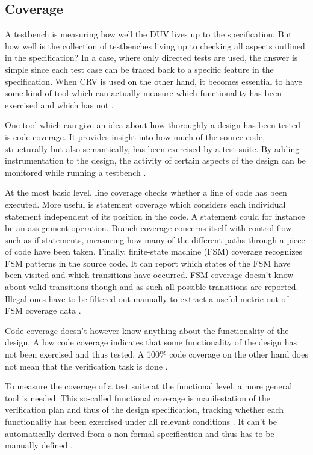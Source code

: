 \documentclass[12pt]{report}
\begin{document}
\subsection{Coverage} %

A testbench is measuring how well the DUV lives up to the specification. But how well is the collection of
testbenches living up to checking all aspects outlined in the specification? In a case, where only directed tests are
used, the answer is simple since each test case can be traced back to a specific feature in the specification. When
CRV is used on the other hand, it becomes essential to have some kind of tool which can actually measure which
functionality has been exercised and which has not \cite[Ch. 15]{mehta2021introduction}.

One tool which can give an idea about how thoroughly a design has been tested is code coverage. It provides insight
into how much of the source code, structurally but also semantically, has been exercised by a test suite. By adding
instrumentation to the design, the activity of certain aspects of the design can be monitored while running a
testbench \cite[Ch. 2]{bergeron2012writing}.

At the most basic level, line coverage checks whether a line of code has been executed. More useful is statement
coverage which considers each individual statement independent of its position in the code. A statement could for
instance be an assignment operation. Branch coverage concerns itself with control flow such as if-statements,
measuring how many of the different paths through a piece of code have been taken. Finally, finite-state machine
(FSM) coverage recognizes FSM patterns in the source code. It can report which states of the FSM have been visited
and which transitions have occurred. FSM coverage doesn't know about valid transitions though and as such all
possible transitions are reported. Illegal ones have to be filtered out manually to extract a useful metric out of
FSM coverage data \cite[Ch. 15]{mehta2021introduction}.

Code coverage doesn't however know anything about the functionality of the design. A low code coverage indicates that
some functionality of the design has not been exercised and thus tested. A 100\% code coverage on the other hand does
not mean that the verification task is done \cite[Ch. 2]{bergeron2012writing}.

To measure the coverage of a test suite at the functional level, a more general tool is needed. This so-called
functional coverage is manifestation of the verification plan and thus of the design specification, tracking whether
each functionality has been exercised under all relevant conditions \cite[Sec. 7.6]{flake2020a}. It can't be
automatically derived from a non-formal specification and thus has to be manually defined \cite[Ch. 15]{mehta2021introduction}.
\end{document}
